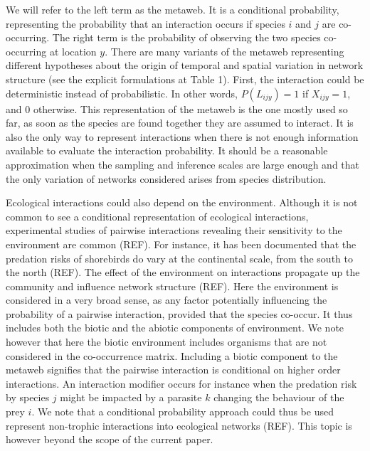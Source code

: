 \documentclass[12pt]{article}
\begin{document}
We will refer to the left term as the metaweb. It is a conditional
probability, representing the probability that an interaction occurs if
species $i$ and $j$ are co-occurring. The right term is the probability
of observing the two species co-occurring at location $y$. There are many
variants of the metaweb representing different hypotheses about the origin
of temporal and spatial variation in network structure (see the explicit
formulations at Table 1). First, the interaction could be deterministic
instead of probabilistic. In other words, $P(L_{ijy}) = 1$ if $X_{ijy} =
1$, and 0 otherwise. This representation of the metaweb is the one mostly
used so far, as soon as the species are found together they are assumed to
interact. It is also the only way to represent interactions when there is
not enough information available to evaluate the interaction probability. It
should be a reasonable approximation when the sampling and inference scales
are large enough and that the only variation of networks considered arises
from species distribution.

Ecological interactions could also depend on the environment. Although it
is not common to see a conditional representation of ecological interactions,
experimental studies of pairwise interactions revealing their sensitivity to
the environment are common (REF). For instance, it has been documented that the
predation risks of shorebirds do vary at the continental scale, from the south
to the north (REF). The effect of the environment on interactions propagate
up the community and influence network structure (REF). Here the environment
is considered in a very broad sense, as any factor potentially influencing the
probability of a pairwise interaction, provided that the species co-occur. It
thus includes both the biotic and the abiotic components of environment. We
note however that here the biotic environment includes organisms that are
not considered in the co-occurrence matrix. Including a biotic component to
the metaweb signifies that the pairwise interaction is conditional on higher
order interactions. An interaction modifier occurs for instance when the
predation risk by species $j$ might be impacted by a parasite $k$ changing
the behaviour of the prey $i$. We note that a conditional probability approach
could thus be used represent non-trophic interactions into ecological networks
(REF). This topic is however beyond the scope of the current paper.
\end{document}
